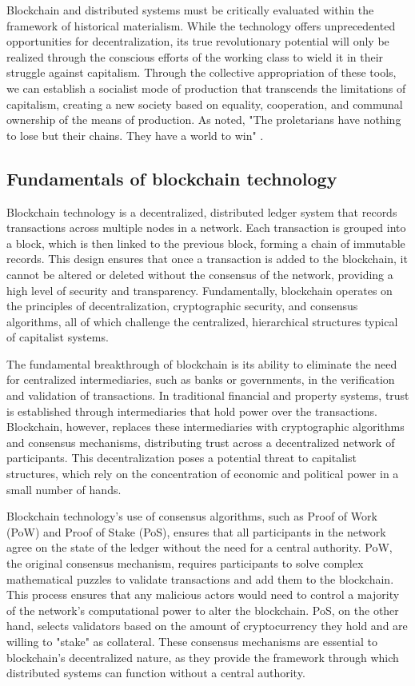 \begin{refsection}
Blockchain and distributed systems must be critically evaluated within the framework of historical materialism. While the technology offers unprecedented opportunities for decentralization, its true revolutionary potential will only be realized through the conscious efforts of the working class to wield it in their struggle against capitalism. Through the collective appropriation of these tools, we can establish a socialist mode of production that transcends the limitations of capitalism, creating a new society based on equality, cooperation, and communal ownership of the means of production. As noted, "The proletarians have nothing to lose but their chains. They have a world to win" \cite[pp.~123-124]{marx2022}.

\subsection{Fundamentals of blockchain technology}

Blockchain technology is a decentralized, distributed ledger system that records transactions across multiple nodes in a network. Each transaction is grouped into a block, which is then linked to the previous block, forming a chain of immutable records. This design ensures that once a transaction is added to the blockchain, it cannot be altered or deleted without the consensus of the network, providing a high level of security and transparency. Fundamentally, blockchain operates on the principles of decentralization, cryptographic security, and consensus algorithms, all of which challenge the centralized, hierarchical structures typical of capitalist systems.

The fundamental breakthrough of blockchain is its ability to eliminate the need for centralized intermediaries, such as banks or governments, in the verification and validation of transactions. In traditional financial and property systems, trust is established through intermediaries that hold power over the transactions. Blockchain, however, replaces these intermediaries with cryptographic algorithms and consensus mechanisms, distributing trust across a decentralized network of participants. This decentralization poses a potential threat to capitalist structures, which rely on the concentration of economic and political power in a small number of hands.

Blockchain technology's use of consensus algorithms, such as Proof of Work (PoW) and Proof of Stake (PoS), ensures that all participants in the network agree on the state of the ledger without the need for a central authority. PoW, the original consensus mechanism, requires participants to solve complex mathematical puzzles to validate transactions and add them to the blockchain. This process ensures that any malicious actors would need to control a majority of the network's computational power to alter the blockchain. PoS, on the other hand, selects validators based on the amount of cryptocurrency they hold and are willing to "stake" as collateral. These consensus mechanisms are essential to blockchain's decentralized nature, as they provide the framework through which distributed systems can function without a central authority.


\end{refsection}
